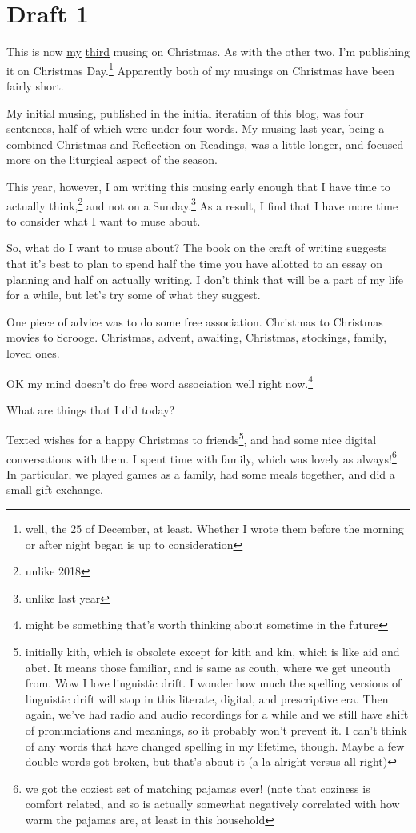 \documentclass[12pt]{article}[titlepage]
\newcommand{\1}{\={a}}
\newcommand{\2}{\={e}}
\newcommand{\3}{\={\i}}
\newcommand{\4}{\=o}
\newcommand{\5}{\=u}
\newcommand{\6}{\={A}}
\renewcommand{\,}{\textsuperscript{,}}
\begin{document}
\section{Draft 1}
This is now \href{christmas-2018.html}{my} \href{christmas-2022.html}{third} musing on Christmas.
As with the other two, I'm publishing it on Christmas Day.\footnote{well, the 25 of December, at least. Whether I wrote them before the morning or after night began is up to consideration}
Apparently both of my musings on Christmas have been fairly short.

My initial musing, published in the initial iteration of this blog, was four sentences, half of which were under four words.
My musing last year, being a combined Christmas and Reflection on Readings, was a little longer, and focused more on the liturgical aspect of the season.

This year, however, I am writing this musing early enough that I have time to actually think,\footnote{unlike 2018} and not on a Sunday.\footnote{unlike last year}
As a result, I find that I have more time to consider what I want to muse about.

So, what do I want to muse about?
The book on the craft of writing suggests that it's best to plan to spend half the time you have allotted to an essay on planning and half on actually writing.
I don't think that will be a part of my life for a while, but let's try some of what they suggest.

One piece of advice was to do some free association.
Christmas to Christmas movies to Scrooge.
Christmas, advent, awaiting, 
Christmas, stockings, family, loved ones.

OK my mind doesn't do free word association well right now.\footnote{might be something that's worth thinking about sometime in the future}

What are things that I did today?

Texted wishes for a happy Christmas to friends\footnote{initially kith, which is obsolete except for kith and kin, which is like aid and abet. It means those familiar, and is same as couth, where we get uncouth from. Wow I love linguistic drift. I wonder how much the spelling versions of linguistic drift will stop in this literate, digital, and prescriptive era. Then again, we've had radio and audio recordings for a while and we still have shift of pronunciations and meanings, so it probably won't prevent it. I can't think of any words that have changed spelling in my lifetime, though. Maybe a few double words got broken, but that's about it (a la alright versus all right)}, and had some nice digital conversations with them.
I spent time with family, which was lovely as always!\footnote{we got the coziest set of matching pajamas ever! (note that coziness is comfort related, and so is actually somewhat negatively correlated with how warm the pajamas are, at least in this household}
In particular, we played games as a family, had some meals together, and did a small gift exchange.
\end{document}
